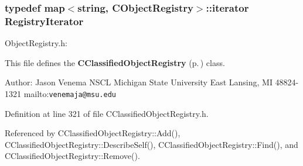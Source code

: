 \subsubsection{\setlength{\rightskip}{0pt plus 5cm}typedef map$<$string, {\bf CObject\-Registry}$>$::iterator Registry\-Iterator}\label{CClassifiedObjectRegistry_8h_a0}


Object\-Registry.h:

This file defines the {\bf CClassified\-Object\-Registry} {\rm (p.\,\pageref{classCClassifiedObjectRegistry})} class.

Author: Jason Venema NSCL Michigan State University East Lansing, MI 48824-1321 mailto:{\tt venemaja@msu.edu} 

Definition at line 321 of file CClassified\-Object\-Registry.h.

Referenced by CClassified\-Object\-Registry::Add(), CClassified\-Object\-Registry::Describe\-Self(), CClassified\-Object\-Registry::Find(), and CClassified\-Object\-Registry::Remove().